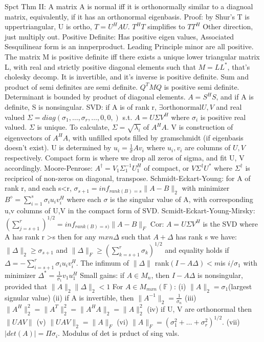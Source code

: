 \documentclass[8pt]{extarticle}
\theoremstyle{definition}
\begin{document}
{Spct Thm II: A matrix A is normal iff it is orthonormally similar to a diagnoal matrix, equivalently, if it has an orthonormal eigenbasis. Proof: by Shur's T is uppertriangular, U is ortho, $T=U^HAU$. $T^HT$ simplifies to $TT^H$
Other direction, just multiply out. 
Positive Definite: Has positive eigen values, Associated Sesquilinear form is an innperproduct. Leading Principle minor are all positive. The matrix M is positive definite iff there exists a unique lower triangular matrix L, with real and strictly positive diagonal elements such that $M = LL^*$, that's cholesky decomp.
It is invertible, and it's inverse is positive definite. Sum and product of semi definites are semi definite. $Q^TMQ$ is positive semi definite.
Determinant is bounded by product of diagonal elements.
$A = S^HS$, and if A is definite, S is nonsingular.
SVD: if A is of rank r, $\exists \text{orthonormal} U, V$ and real valued $\Sigma = diag(\sigma_1,\dots,\sigma_r, \dots,0,0,)$ s.t. $A = U\Sigma V^H$ where $\sigma_i$ is positive real valued. $\Sigma$ is unique. To calculate, $\Sigma = \sqrt{\lambda_i} $ of $A^HA$. V is construction of eigenvectors of $A^HA$, with unfilled spots filled by gramschmidt (if eigenbasis doesn't exist). U is determined by $u_i = \frac{1}{\sigma}Av_i$ where $u_i, v_i$ are columns of $U,V$ respectively. Compact form is where we drop all zeros of sigma, and fit U, V accordingly.
Moore-Penrose: $A^\dagger = V_1 \Sigma^{-1}_1 U_1^H$ of compact, or $V\Sigma^\dagger U^*$ where $\Sigma^\dagger$ is recipricol of non-zeros on diagonal, transpose. 
Schmidt-Eckart-Young: for A of rank r, and each s<r, $\sigma_{s+1} = inf_{rank(B) =s}\|A-B\|_2$ 
with minimizer $ B^\diamond = \sum_{i=1}^s \sigma_iu_iv_i^H$ where each $\sigma$ is the singular value of A, with corresponding u,v columns of U,V in the compact form of SVD.
Scmidt-Eckart-Young-Mirsky: $(\sum_{j=s+1}^r)^{1/2} = inf_{rank(B)=s)}\|A-B\|_F $
Cor: $A = U\Sigma V^H$ is the SVD where A has rank r >s then for any $mxn \Delta$ such that $A+\Delta$ has rank s we have: $\|\Delta\|_2 \geq \sigma_{s+1}$ and $\|\Delta\|_F \geq (\sum^r_{k=s+1}\sigma_k)^{1/2}$ and equality holds if $\Delta = -\sum^r_{i=s+1} \sigma_i u_iv_i^H$.
The infimum of $\|\Delta\|$ rank$(I-A\Delta) < m $is $i/\sigma_1$ with minimizer $\Delta^* = \frac{1}{\sigma_1}v_1u_1^H$
Small gains: if $A \in M_n$, then $I-A\Delta$ is nonsingular, provided that $\|A\|_2\|\Delta\|_2 <1$
For $A \in M_{mxn}(\mathbb{F})$: (i) $\|A\|_2 = \sigma_1$(largest signular value) (ii) if A is invertible, then $\|A^{-1}\|_2 = \frac{1}{\sigma_n}$ (iii) $\|A^H\|^2_2 = \|A^T\|^2_2 = \|A^HA\|_2 = \|A\|^2_2 $ (iv) if U, V are orthonormal then $\|UAV\|$ (v) $\|UAV\|_2 = \|A\|_F$ (vi) $\|A\|_F = (\sigma_1^2+\dots+\sigma_r^2)^{1/2}$. (vii) $|det(A)| = \Pi \sigma_i$. Modulus of det is prduct of sing vals. 
}
\end{document}
